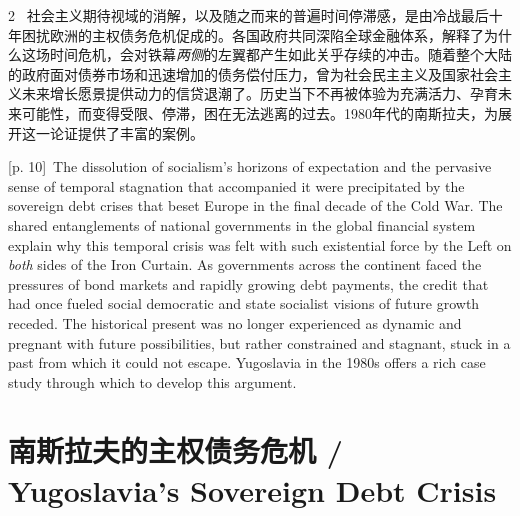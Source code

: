 \documentclass[10pt,a4paper]{article}
\begin{document}
\begin{paracol}{2}
\switchcolumn*
{\scriptsize\color{gray} [p. 10]}\ 社会主义期待视域的消解，以及随之而来的普遍时间停滞感，是由冷战最后十年困扰欧洲的主权债务危机促成的。各国政府共同深陷全球金融体系，解释了为什么这场时间危机，会对铁幕\textit{两侧}的左翼都产生如此关乎存续的冲击。随着整个大陆的政府面对债券市场和迅速增加的债务偿付压力，曾为社会民主主义及国家社会主义未来增长愿景提供动力的信贷退潮了。历史当下不再被体验为充满活力、孕育未来可能性，而变得受限、停滞，困在无法逃离的过去。1980年代的南斯拉夫，为展开这一论证提供了丰富的案例。\par
\switchcolumn
{\scriptsize\color{gray} [p. 10]}\ The dissolution of socialism’s horizons of expectation and the pervasive sense of temporal stagnation that accompanied it were precipitated by the sovereign debt crises that beset Europe in the final decade of the Cold War. The shared entanglements of national governments in the global financial system explain why this temporal crisis was felt with such existential force by the Left on \textit{both} sides of the Iron Curtain. As governments across the continent faced the pressures of bond markets and rapidly growing debt payments, the credit that had once fueled social democratic and state socialist visions of future growth receded. The historical present was no longer experienced as dynamic and pregnant with future possibilities, but rather constrained and stagnant, stuck in a past from which it could not escape. Yugoslavia in the 1980s offers a rich case study through which to develop this argument.\par
\switchcolumn*
\end{paracol}
\section*{南斯拉夫的主权债务危机 / Yugoslavia’s Sovereign Debt Crisis}
\end{document}
